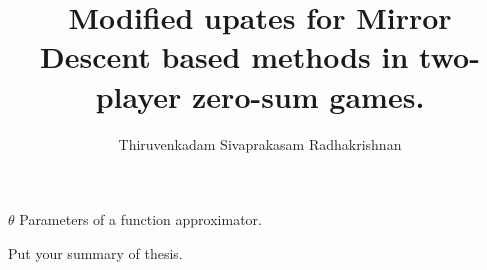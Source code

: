 \documentclass{uicthesi}
\begin{document}

\title{Modified upates for Mirror Descent based methods in two-player zero-sum games.}
\author{Thiruvenkadam Sivaprakasam Radhakrishnan}
\pdegrees{}
 \maketitle


\tableofcontents \listoftables \listoffigures
\listofabbreviations
\begin{list} {} {\setlength {\labelwidth}{1in} \setlength{\leftmargin}{1.5in}
		\setlength{\labelsep}{.5in} \setlength{\rightmargin}{\leftmargin}}
	\item[$\theta$\hfill] Parameters
		of a function approximator.
\end{list}

\summary
Put your summary of thesis.











% 
% 

\appendices
\newpage
\appendix
\end{document}
